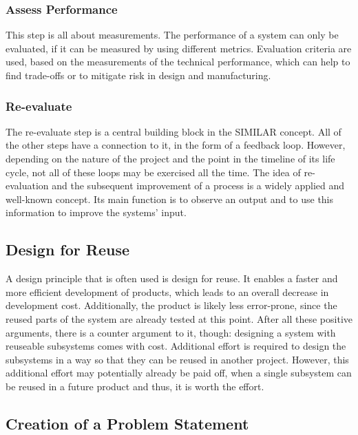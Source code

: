 \subsubsection{Assess Performance}

This step is all about measurements.
The performance of a system can only be evaluated, if it can be measured by using different metrics.
Evaluation criteria are used, based on the measurements of the technical performance, which can help to find trade-offs or to mitigate risk in design and manufacturing.

\subsubsection{Re-evaluate}

The re-evaluate step is a central building block in the SIMILAR concept.
All of the other steps have a connection to it, in the form of a feedback loop.
However, depending on the nature of the project and the point in the timeline of its life cycle, not all of these loops may be exercised all the time.
The idea of re-evaluation and the subsequent improvement of a process is a widely applied and well-known concept.
Its main function is to observe an output and to use this information to improve the systems' input.

\subsection{Design for Reuse}

A design principle that is often used is design for reuse.
It enables a faster and more efficient development of products, which leads to an overall decrease in development cost.
Additionally, the product is likely less error-prone, since the reused parts of the system are already tested at this point.
After all these positive arguments, there is a counter argument to it, though: designing a system with reuseable subsystems comes with cost.
Additional effort is required to design the subsystems in a way so that they can be reused in another project.
However, this additional effort may potentially already be paid off, when a single subsystem can be reused in a future product and thus, it is worth the effort.

\subsection{Creation of a Problem Statement}



